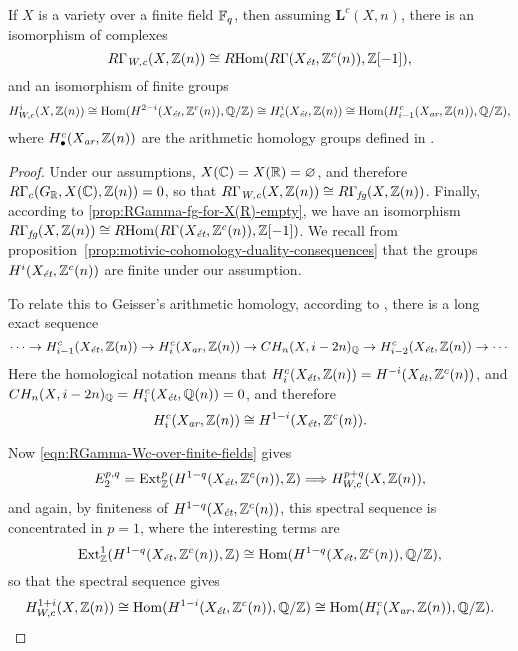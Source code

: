\documentclass{article}
\numberwithin{equation}{section}
\begin{document}
\begin{proposition}
  If $X$ is a variety over a finite field $\FF_q$, then assuming
  $\mathbf{L}^c (X,n)$, there is an isomorphism of complexes
  \begin{equation}
    \label{eqn:RGamma-Wc-over-finite-fields}
    R\Gamma_\Wc (X,\ZZ(n)) \cong \RHom (R\Gamma (X_\et, \ZZ^c (n)), \ZZ [-1]),
  \end{equation}
  and an isomorphism of finite groups
  \[ H^i_{W,c} (X, \ZZ (n)) \cong
    \Hom (H^{2-i} (X_\et, \ZZ^c (n)), \QQ/\ZZ) \cong
    H^i_c (X_\et, \ZZ(n)) \cong
    \Hom (H_{i-1}^c (X_\ar, \ZZ (n)), \QQ/\ZZ), \]
  where $H_\bullet^c (X_\ar, \ZZ (n))$ are the arithmetic homology groups
  defined in \cite[\S 3]{Geisser-2010-arithmetic-homology}.

  \begin{proof}
    Under our assumptions, $X (\CC) = X (\RR) = \emptyset$, and therefore
    $R\Gamma_c (G_\RR, X (\CC), \ZZ (n)) = 0$, so that
    $R\Gamma_\Wc (X,\ZZ(n)) \cong R\Gamma_\fg (X, \ZZ (n))$.
    Finally, according to \ref{prop:RGamma-fg-for-X(R)-empty}, we have
    an isomorphism
    $R\Gamma_\fg (X, \ZZ (n)) \cong \RHom (R\Gamma (X_\et, \ZZ^c (n)), \ZZ [-1])$.
    We recall from proposition~\ref{prop:motivic-cohomology-duality-consequences}
    that the groups $H^i (X_\et, \ZZ^c(n))$ are finite under our assumption.

    To relate this to Geisser's arithmetic homology, according to
    \cite[Theorem~3.1]{Geisser-2010-arithmetic-homology}, there is a long exact
    sequence
    \[ \cdots \to H_{i-1}^c (X_\et, \ZZ (n)) \to
      H_i^c (X_\ar, \ZZ (n)) \to CH_n (X, i-2n)_\QQ \to
      H_{i-2}^c (X_\et, \ZZ (n)) \to \cdots \]
    Here the homological notation means that
    $H_i^c (X_\et, \ZZ (n)) = H^{-i} (X_\et, \ZZ^c (n))$,
    and $CH_n (X, i-2n)_\QQ = H_i^c (X_\et, \QQ (n)) = 0$, and therefore
    $$H_i^c (X_\ar, \ZZ (n)) \cong H^{1-i} (X_\et, \ZZ^c (n)).$$

    Now \eqref{eqn:RGamma-Wc-over-finite-fields} gives
    \begin{equation}
      \label{eqn:RGamma-Wc-over-finite-fields-ss}
      E_2^{p,q} = \Ext_\ZZ^p (H^{1-q} (X_\et, \ZZ^c (n)), \ZZ) \Longrightarrow
      H^{p+q}_{W,c} (X, \ZZ (n)),
    \end{equation}
    and again, by finiteness of $H^{1-q} (X_\et, \ZZ^c (n))$, this spectral
    sequence is concentrated in $p = 1$, where the interesting terms are
    \[ \Ext_\ZZ^1 (H^{1-q} (X_\et, \ZZ^c (n)), \ZZ) \cong
      \Hom (H^{1-q} (X_\et, \ZZ^c (n)), \QQ/\ZZ), \]
    so that the spectral sequence gives
    \[ H^{1+i}_{W,c} (X, \ZZ (n)) \cong
      \Hom (H^{1-i} (X_\et, \ZZ^c (n)), \QQ/\ZZ) \cong
      \Hom (H_i^c (X_\ar, \ZZ (n)), \QQ/\ZZ). \qedhere \]
  \end{proof}
\end{proposition}
\end{document}
